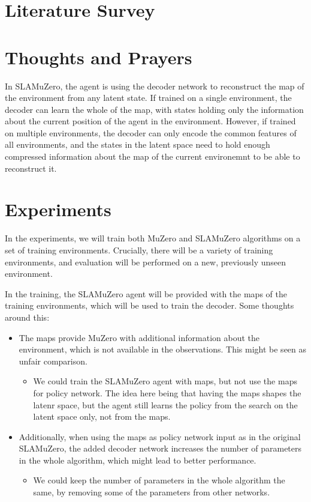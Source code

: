 \documentclass[12pt]{article}
\begin{document}
% 

\section{Literature Survey}

\section{Thoughts and Prayers}
In SLAMuZero, the agent is using the decoder network to reconstruct the map of the environment from any latent state. If trained on a single environment, the decoder can learn the whole of the map, with states holding only the information about the current position of the agent in the environment. However, if trained on multiple environments, the decoder can only encode the common features of all environments, and the states in the latent space need to hold enough compressed information about the map of the current environemnt to be able to reconstruct it.

\section{Experiments}
In the experiments, we will train both MuZero and SLAMuZero algorithms on a set of training environments. Crucially, there will be a variety of training environments, and evaluation will be performed on a new, previously unseen environment. 

In the training, the SLAMuZero agent will be provided with the maps of the training environments, which will be used to train the decoder. Some thoughts around this:

\begin{itemize}
    \item The maps provide MuZero with additional information about the environment, which is not available in the observations. This might be seen as unfair comparison.
    \begin{itemize}
        \item We could train the SLAMuZero agent with maps, but not use the maps for policy network. The idea here being that having the maps shapes the latenr space, but the agent still learns the policy from the search on the latent space only, not from the maps.
    \end{itemize}
    \item Additionally, when using the maps as policy network input as in the original SLAMuZero, the added decoder network increases the number of parameters in the whole algorithm, which might lead to better performance.
    \begin{itemize}
        \item We could keep the number of parameters in the whole algorithm the same, by removing some of the parameters from other networks.
    \end{itemize}
\end{itemize}
\end{document}
